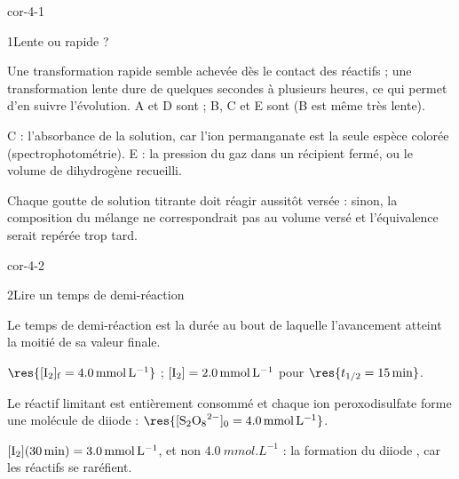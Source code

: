 \corrigesSouples

\begin{blocLivre}{cor-4-1}
\begin{corrige}{1}{Lente ou rapide ?}
\begin{questions}
\item Une transformation rapide semble achevée dès le contact des réactifs ; une transformation lente dure de quelques
secondes à plusieurs heures, ce qui permet d'en suivre l'évolution. A et D sont  ;
B, C et E sont  (B est même très lente).
\item C : l'absorbance de la solution, car l'ion permanganate est la seule espèce colorée (spectrophotométrie).
E : la pression du gaz dans un récipient fermé, ou le volume de dihydrogène recueilli.
\item Chaque goutte de solution titrante doit réagir aussitôt versée : sinon, la composition du mélange ne
correspondrait pas au volume versé et l'équivalence serait repérée trop tard.
\end{questions}
\end{corrige}
\end{blocLivre}
\begin{blocLivre}{cor-4-2}
\begin{corrige}{2}{Lire un temps de demi-réaction}
\begin{questions}
\item Le temps de demi-réaction est la durée au bout de laquelle l'avancement atteint la moitié de sa valeur finale.
\item $\res{[\ce{I2}]_\mathrm{f}=\qty{4,0}{mmol.L^{-1}}}$ ; $[\ce{I2}]=\qty{2,0}{mmol.L^{-1}}$ pour $\res{t_{1/2}=\qty{15}{min}}$.
\item Le réactif limitant est entièrement consommé et chaque ion peroxodisulfate forme une molécule de diiode :
$\res{[\ce{S2O8^2-}]_0=\qty{4,0}{mmol.L^{-1}}}$.
\item $[\ce{I2}](\qty{30}{min})=\qty{3,0}{mmol.L^{-1}}$, et non $\qty{4,0}{mmol.L^{-1}}$ : la formation du diiode
, car les réactifs se raréfient.
\end{questions}
\end{corrige}
\end{blocLivre}
